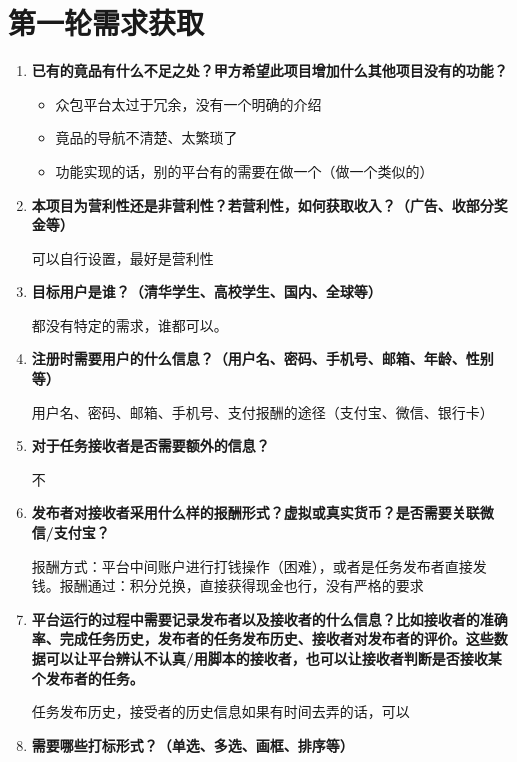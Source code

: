 \section{第一轮需求获取} \label{sec:interview1}

\begin{enumerate}
    \item \textbf{已有的竟品有什么不足之处？甲方希望此项目增加什么其他项目没有的功能？}
    \begin{itemize}
        \item 众包平台太过于冗余，没有一个明确的介绍
        \item 竟品的导航不清楚、太繁琐了
        \item 功能实现的话，别的平台有的需要在做一个（做一个类似的）
    \end{itemize}
    \item \textbf{本项目为营利性还是非营利性？若营利性，如何获取收入？（广告、收部分奖金等）}
    
    可以自行设置，最好是营利性

    \item \textbf{目标用户是谁？（清华学生、高校学生、国内、全球等）}

    都没有特定的需求，谁都可以。

    \item \textbf{注册时需要用户的什么信息？（用户名、密码、手机号、邮箱、年龄、性别等）}
    
    用户名、密码、邮箱、手机号、支付报酬的途径（支付宝、微信、银行卡）

    \item \textbf{对于任务接收者是否需要额外的信息？}
    
    不
    
    \item \textbf{发布者对接收者采用什么样的报酬形式？虚拟或真实货币？是否需要关联微信/支付宝？}
    
    报酬方式：平台中间账户进行打钱操作（困难），或者是任务发布者直接发钱。报酬通过：积分兑换，直接获得现金也行，没有严格的要求
    
    \item \textbf{平台运行的过程中需要记录发布者以及接收者的什么信息？比如接收者的准确率、完成任务历史，发布者的任务发布历史、接收者对发布者的评价。这些数据可以让平台辨认不认真/用脚本的接收者，也可以让接收者判断是否接收某个发布者的任务。}
    
    任务发布历史，接受者的历史信息如果有时间去弄的话，可以

    \item \textbf{需要哪些打标形式？（单选、多选、画框、排序等）}
    

\end{enumerate}
